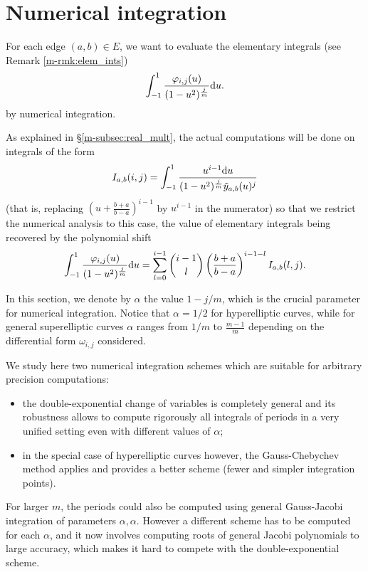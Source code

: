 \documentclass[main.tex]{subfiles}
\begin{document}
  \section{Numerical integration}\label{sec:numerical_integration}

  For each edge $(a,b) \in E$, we want to evaluate the elementary integrals
  (see Remark \ref{m-rmk:elem_ints})
\begin{align*}
 \int_{-1}^1 \frac{\varphi_{i,j}(u)}{(1-u^2)^{\frac{j}{m}}}  \mathrm d u.
\end{align*}
  by numerical integration.
  
 As explained in \S \ref{m-subsec:real_mult}, the actual computations will be done on integrals of the form
\begin{equation}
    \label{eq:elem_num_int}
    I_{a,b}(i,j) = \int_{-1}^1\frac{u^{i-1}\mathrm d u}{(1-u^2)^{\frac jm}\tilde{y}_{a,b}(u)^j}
\end{equation}
(that is, replacing $(u+\frac{b+a}{b-a})^{i-1}$ by $u^{i-1}$ in the numerator)
so that we restrict the numerical analysis to this case,
the value of elementary integrals being recovered by the polynomial shift
\begin{equation}
    \label{eq:polshift}
    \int_{-1}^1\frac{\varphi_{i,j}(u)}{(1-u^2)^{\frac jm}}\mathrm d u
    = \sum_{l=0}^{i-1} {i-1 \choose l} \left(\frac{b+a}{b-a}\right)^{i-1-l} I_{a,b}(l,j).
\end{equation}
 
In this section, we denote by $α$ the value $1-j/m$, which is the crucial parameter for numerical integration.
Notice that $α=1/2$ for hyperelliptic curves, while for general superelliptic curves $α$ ranges
from $1/m$ to $\frac{m-1}m$ depending on the differential form $\omega_{i,j}$ considered.

We study here two numerical integration schemes which are suitable for arbitrary
precision computations:
\begin{itemize}
    \item 
        the double-exponential change of variables is completely general \cite{Molin2010} and its robustness
allows to compute rigorously all integrals of periods in a very unified setting
even with different values of $\alpha$;
\item in the special case of hyperelliptic curves however,
    the Gauss-Chebychev method \cite[25.4.38]{AbramowitzStegun} applies and
    provides a better scheme (fewer and simpler integration points).
\end{itemize}
For larger $m$, the periods could also be computed using general Gauss-Jacobi integration
of parameters $\alpha,\alpha$. However a different scheme has to be computed for each $\alpha$,
and it now involves computing roots of general Jacobi polynomials to large accuracy, which
makes it hard to compete with the double-exponential scheme.
\end{document}
